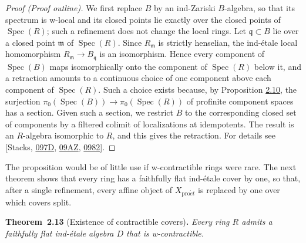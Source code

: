 \documentclass[11pt]{article}
\newenvironment{bpstatement}[2]{\par\addvspace{0.6\baselineskip}\noindent\textbf{#1}#2\textbf{.}\enspace\ignorespaces}
  {\par\addvspace{0.4\baselineskip}}
\newenvironment{bpstatementit}[2]{\begin{bpstatement}{#1}{#2}\itshape\ignorespaces}{\end{bpstatement}}
\begin{document}
\begin{proof}[{Proof (Proof outline)}]\label{bp35}%
We first replace \(B\) by an ind-Zariski \(B\)-algebra, so that its spectrum is w-local and its closed points lie exactly over the closed points of \(\operatorname{Spec}(R)\); such a refinement does not change the local rings. Let \(\mathfrak q\subset B\) lie over a closed point \(\mathfrak m\) of \(\operatorname{Spec}(R)\). Since \(R_{\mathfrak m}\) is strictly henselian, the ind-étale local homomorphism \(R_{\mathfrak m}\to B_{\mathfrak q}\) is an isomorphism. Hence every component of \(\operatorname{Spec}(B)\) maps isomorphically onto the component of \(\operatorname{Spec}(R)\) below it, and a retraction amounts to a continuous choice of one component above each component of \(\operatorname{Spec}(R)\). Such a choice exists because, by Proposition \hyperref[bp28]{2.10}, the surjection \(\pi_0(\operatorname{Spec}(B))\to\pi_0(\operatorname{Spec}(R))\) of profinite component spaces has a section. Given such a section, we restrict \(B\) to the corresponding closed set of components by a filtered colimit of localizations at idempotents. The result is an \(R\)-algebra isomorphic to \(R\), and this gives the retraction. For details see [Stacks, \href{https://stacks.math.columbia.edu/tag/097D}{097D}, \href{https://stacks.math.columbia.edu/tag/09AZ}{09AZ}, \href{https://stacks.math.columbia.edu/tag/0982}{0982}].
\end{proof}

\label{bp36}%
The proposition would be of little use if w-contractible rings were rare. The next theorem shows that every ring has a faithfully flat ind-étale cover by one, so that, after a single refinement, every affine object of \(X_{\mathrm{pro}\acute{e}t}\) is replaced by one over which covers split.

\label{bp37}%
\begin{bpstatementit}{Theorem~2.13}{ (Existence of contractible covers)}
Every ring \(R\) admits a faithfully flat ind-étale algebra \(D\) that is w-contractible.
\end{bpstatementit}
\end{document}
